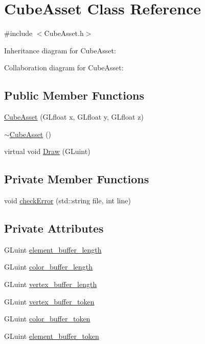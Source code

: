 \hypertarget{classCubeAsset}{}\section{Cube\+Asset Class Reference}
\label{classCubeAsset}


{\ttfamily \#include $<$Cube\+Asset.\+h$>$}



Inheritance diagram for Cube\+Asset\+:


Collaboration diagram for Cube\+Asset\+:
\subsection*{Public Member Functions}
\begin{DoxyCompactItemize}
\item 
\hyperlink{classCubeAsset_a0252e564114a3cda7e3911ef95742a34}{Cube\+Asset} (G\+Lfloat x, G\+Lfloat y, G\+Lfloat z)
\item 
\hyperlink{classCubeAsset_ab3ab9a5da82cbf8537a28652410093b1}{$\sim$\+Cube\+Asset} ()
\item 
virtual void \hyperlink{classCubeAsset_a1af568486056e254ffcf98fd99947bfe}{Draw} (G\+Luint)
\end{DoxyCompactItemize}
\subsection*{Private Member Functions}
\begin{DoxyCompactItemize}
\item 
void \hyperlink{classCubeAsset_ac3855728a8d6c1612ebc85f82d3b535e}{check\+Error} (std\+::string file, int line)
\end{DoxyCompactItemize}
\subsection*{Private Attributes}
\begin{DoxyCompactItemize}
\item 
G\+Luint \hyperlink{classCubeAsset_ac66c2ec869f392515dad4ebda1fe4792}{element\+\_\+buffer\+\_\+length}
\item 
G\+Luint \hyperlink{classCubeAsset_ac4c2395c395e9bcebc5d15d425a505ec}{color\+\_\+buffer\+\_\+length}
\item 
G\+Luint \hyperlink{classCubeAsset_a3054ed8a7d6cc1575aebdfc40038847b}{vertex\+\_\+buffer\+\_\+length}
\item 
G\+Luint \hyperlink{classCubeAsset_a31bd098f60e2c24988316a9cc9335987}{vertex\+\_\+buffer\+\_\+token}
\item 
G\+Luint \hyperlink{classCubeAsset_a4cb558d463a5fa01ba7fdd884e697a73}{color\+\_\+buffer\+\_\+token}
\item 
G\+Luint \hyperlink{classCubeAsset_a4fae699256e7c5633a8174a93ca8a0ec}{element\+\_\+buffer\+\_\+token}
\end{DoxyCompactItemize}



